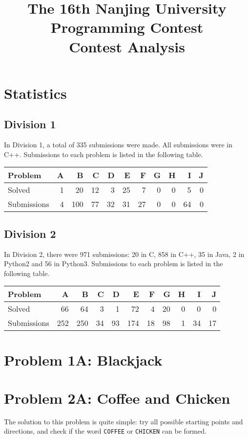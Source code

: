 \documentclass[a4paper,10.5pt,twoside]{article}
\title{\LARGE{The 16th Nanjing University Programming Contest} \\ Contest Analysis}
\begin{document}
\maketitle

\section*{Statistics}
\subsection*{Division 1}
In Division 1, a total of 335 submissions were made. All submissions were in C++. Submissions to each problem is listed in the following table.
\begin{table}[h]
\centering
\begin{tabular}{|l|rrrrrrrrrr|}
\hline
Problem & A & B & C & D & E & F & G & H & I & J \\ \hline
Solved & 1 & 20 & 12 & 3 & 25 & 7 & 0 & 0 & 5 & 0 \\
Submissions & 4 & 100 & 77 & 32 & 31 & 27 & 0 & 0 & 64 & 0 \\ \hline
\end{tabular}
\end{table}

\subsection*{Division 2}

In Division 2, there were 971 submissions: 20 in C, 858 in C++, 35 in Java, 2 in Python2 and 56 in Python3. Submissions to each problem is listed in the following table.
\begin{table}[h]
\centering
\begin{tabular}{|l|rrrrrrrrrr|}
\hline
Problem & A & B & C & D & E & F & G & H & I & J \\ \hline
Solved & 66 & 64 & 3 & 1 & 72 & 4 & 20 & 0 & 0 & 0 \\
Submissions & 252 & 250 & 34 & 93 & 174 & 18 & 98 & 1 & 34 & 17 \\ \hline
\end{tabular}

\end{table}

\section*{Problem 1A: Blackjack}

\section*{Problem 2A: Coffee and Chicken}
The solution to this problem is quite simple: try all possible starting points and directions, and check if the word \texttt{COFFEE} or \texttt{CHICKEN} can be formed.
\end{document}
